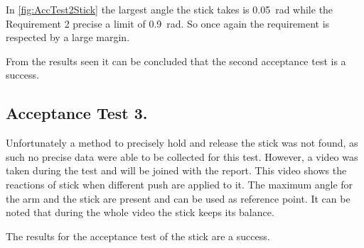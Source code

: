 In \autoref{fig:AccTest2Stick} the largest angle the stick takes is \SI{0.05}{\radian} while the Requirement 2 precise a limit of \SI{0.9}{\radian}. So once again the requirement is respected by a large margin.

From the results seen it can be concluded that the second acceptance test is a success.

\subsection{Acceptance Test 3.}

Unfortunately a method to precisely hold and release the stick was not found, as such no precise data were able to be collected for this test. However, a video was taken during the test and will be joined with the report. This video shows the reactions of stick when different push are applied to it. The maximum angle for the arm and the stick are present and can be used as reference point. It can be noted that during the whole video the stick keeps its balance.

The results for the acceptance test of the stick are a success.